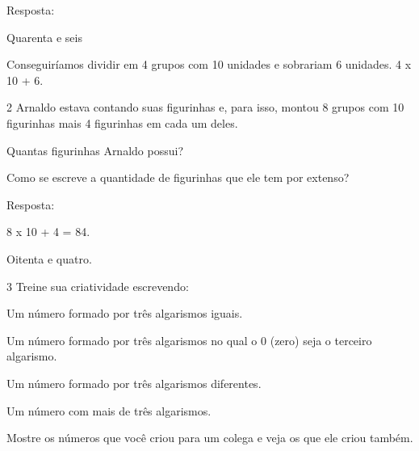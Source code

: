 Resposta:

\begin{escolha}

\item
  Quarenta e seis
\item
  Conseguiríamos dividir em 4 grupos com 10 unidades e sobrariam 6
  unidades. 4 x 10 + 6.
\end{escolha}

\num{2} Arnaldo estava contando suas figurinhas e, para isso, montou 8 grupos com
10 figurinhas mais 4 figurinhas em cada um deles.

\begin{escolha}

\item
  Quantas figurinhas Arnaldo possui?
\end{escolha}


\begin{escolha}

\item
  Como se escreve a quantidade de figurinhas que ele tem por extenso?
\end{escolha}


Resposta:

\begin{escolha}

\item
  8 x 10 + 4 = 84.
\item
  Oitenta e quatro.
\end{escolha}

\num{3} Treine sua criatividade escrevendo:

\begin{escolha}

  \item Um número formado por três algarismos iguais.

  \item Um número formado por três algarismos no qual o 0 (zero) seja o terceiro algarismo.

  \item Um número formado por três algarismos diferentes.

  \item Um número com mais de três algarismos.

  \item Mostre os números que você criou para um colega e veja os que ele
  criou também.

\end{escolha}

